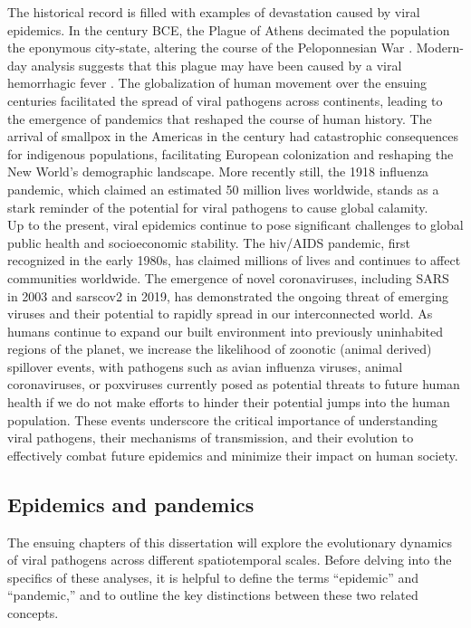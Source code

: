 The historical record is filled with examples of devastation caused by viral epidemics.
In the  century BCE, the Plague of Athens decimated the population the eponymous city-state, altering the course of the Peloponnesian War \citep{thucydides1972history}.
Modern-day analysis suggests that this plague may have been caused by a viral hemorrhagic fever \citep{olson1996thucydides}.
The globalization of human movement over the ensuing centuries facilitated the spread of viral pathogens across continents, leading to the emergence of pandemics that reshaped the course of human history.
The arrival of smallpox in the Americas in the  century had catastrophic consequences for indigenous populations, facilitating European colonization and reshaping the New World's demographic landscape.
More recently still, the 1918 influenza pandemic, which claimed an estimated 50 million lives worldwide, stands as a stark reminder of the potential for viral pathogens to cause global calamity.\\

Up to the present, viral epidemics continue to pose significant challenges to global public health and socioeconomic stability.
The \gls{hiv}/AIDS pandemic, first recognized in the early 1980s, has claimed millions of lives and continues to affect communities worldwide.
The emergence of novel coronaviruses, including SARS in 2003 and \gls{sarscov2} in 2019, has demonstrated the ongoing threat of emerging viruses and their potential to rapidly spread in our interconnected world.
As humans continue to expand our built environment into previously uninhabited regions of the planet, we increase the likelihood of zoonotic (animal derived) spillover events, with pathogens such as avian influenza viruses, animal coronaviruses, or poxviruses currently posed as potential threats to future human health if we do not make efforts to hinder their potential jumps into the human population.
These events underscore the critical importance of understanding viral pathogens, their mechanisms of transmission, and their evolution to effectively combat future epidemics and minimize their impact on human society.\\

\subsection{Epidemics and pandemics}\label{sec:epidemicsVsPandemics}
The ensuing chapters of this dissertation will explore the evolutionary dynamics of viral pathogens across different spatiotemporal scales.
Before delving into the specifics of these analyses, it is helpful to define the terms ``epidemic'' and ``pandemic,'' and to outline the key distinctions between these two related concepts.\\

